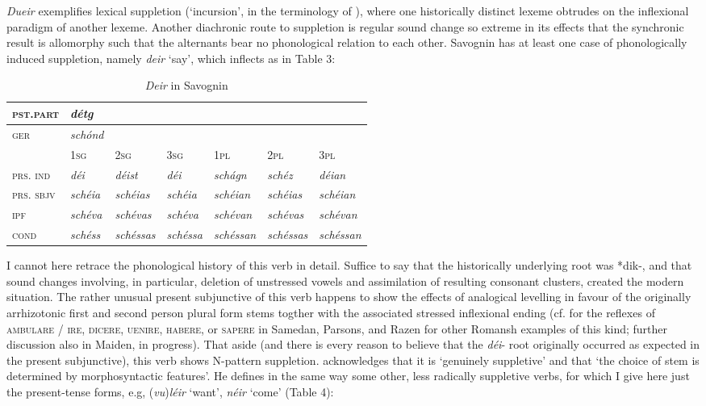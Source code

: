 \documentclass[output=paper,
modfonts
]{LSP/langsci}
\begin{document}
\emph{Dueir} exemplifies lexical suppletion (`incursion', in the
terminology of \citealt{corbett2007a}), where one historically distinct lexeme
obtrudes on the inflexional paradigm of another lexeme. Another
diachronic route to suppletion is regular sound change so extreme in its
effects that the synchronic result is allomorphy such that the
alternants bear no phonological relation to each other. Savognin has at
least one case of phonologically induced suppletion, namely \emph{deir}
`say', which inflects as in Table 3:


\begin{longtable}[]{@{}lllllll@{}}
\caption{ \emph{Deir} in Savognin}\\
\lsptoprule
\textsc{pst.part} & \emph{détg} & & & & &\tabularnewline
\midrule
\endhead
\textsc{ger} & \emph{schónd} & & & & &\tabularnewline
& \textsc{1sg} & \textsc{2sg} & \textsc{3sg} & \textsc{1pl} &
\textsc{2pl} & \textsc{3pl}\tabularnewline
\textsc{prs. ind} & \emph{déi} & \emph{déist} & \emph{déi} &
\emph{schágn} & \emph{schéz} & \emph{déian}\tabularnewline
\textsc{prs. sbjv} & \emph{schéia} & \emph{schéias} & \emph{schéia} &
\emph{schéian} & \emph{schéias} & \emph{schéian}\tabularnewline
\textsc{ipf} & \emph{schéva} & \emph{schévas} & \emph{schéva} &
\emph{schévan} & \emph{schévas} & \emph{schévan}\tabularnewline
\textsc{cond} & \emph{schéss} & \emph{schéssas} & \emph{schéssa} &
\emph{schéssan} & \emph{schéssas} & \emph{schéssan}\tabularnewline
\bottomrule
\end{longtable}

I cannot here retrace the phonological history of this verb in detail.
Suffice to say that the historically underlying root was *dik-, and that
sound changes involving, in particular, deletion of unstressed vowels
and assimilation of resulting consonant clusters, created the modern
situation. The rather unusual present subjunctive of this verb happens
to show the effects of analogical levelling in favour of the originally
arrhizotonic first and second person plural form stems togther with the
associated stressed inflexional ending (cf. \citealt{decurtins1958a} for the
reflexes of \textsc{ambulare / ire}, \textsc{dicere, uenire, habere,} or
\textsc{sapere} in Samedan, Parsons, and Razen for other Romansh
examples of this kind; further discussion also in Maiden, in progress).
That aside (and there is every reason to believe that the \emph{déi}-
root originally occurred as expected in the present subjunctive), this
verb shows N-pattern suppletion. \citet[17]{anderson2011a} acknowledges that it
is `genuinely suppletive' and that `the choice of stem is determined by
morphosyntactic features'. He defines in the same way some other, less
radically suppletive verbs, for which I give here just the present-tense
forms, e.g, (\emph{vu})\emph{léir} `want', \emph{néir} `come' (Table 4):
\end{document}
